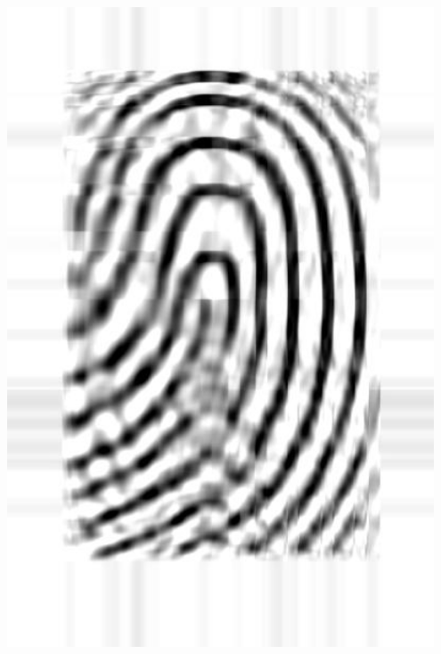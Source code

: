 \documentclass[letter]{amsart}
\begin{document}
\begin{minipage}[H]{0.33\textwidth}
    \centering
    \includegraphics[width=0.95\textwidth]{fingerprintLOOP_svd.jpg}
\end{minipage}

\newpage
\end{document}
